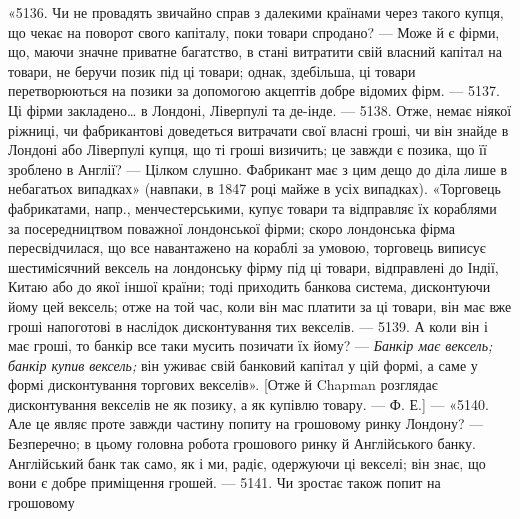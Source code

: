 «5136. Чи не провадять звичайно справ з далекими країнами через такого
купця, що чекає на поворот свого капіталу, поки товари спродано? — Може й
є фірми, що, маючи значне приватне багатство, в стані витратити свій власний
капітал на товари, не беручи позик під ці товари; однак, здебільша, ці товари
перетворюються на позики за допомогою акцептів добре відомих фірм. — 5137.
Ці фірми закладено\dots{} в Лондоні, Ліверпулі та де-інде. — 5138. Отже, немає ніякої
ріжниці, чи фабрикантові доведеться витрачати свої власні гроші, чи він знайде
в Лондоні або Ліверпулі купця, що ті гроші визичить; це завжди є позика, що
її зроблено в Англії? — Цілком слушно. Фабрикант має з цим дещо до діла лише
в небагатьох випадках» (навпаки, в 1847 році майже в усіх випадках). «Торговець
фабрикатами, напр., менчестерськими, купує товари та відправляє їх
кораблями за посередництвом поважної лондонської фірми; скоро лондонська фірма
пересвідчилася, що все навантажено на кораблі за умовою, торговець виписує
шестимісячний вексель на лондонську фірму під ці товари, відправлені до Індії,
Китаю або до якої іншої країни; тоді приходить банкова система, дисконтуючи
йому цей вексель; отже на той час, коли він мас платити за ці товари, він
має вже гроші напоготові в наслідок дисконтування тих векселів. — 5139. А коли
він і має гроші, то банкір все таки мусить позичати їх йому? — \emph{Банкір має
вексель; банкір купив вексель;} він уживає свій банковий капітал у цій формі,
а саме у формі дисконтування торгових векселів». [Отже й Chapman розглядає
дисконтування векселів не як позику, а як купівлю товару. — Ф. Е.] — «5140.
Але це являє проте завжди частину попиту на грошовому ринку Лондону? —
Безперечно; в цьому головна робота грошового ринку й Англійського банку.
Англійський банк так само, як і ми, радіє, одержуючи ці векселі; він знає, що
вони є добре приміщення грошей. — 5141. Чи зростає також попит на грошовому
\parbreak{}  %
